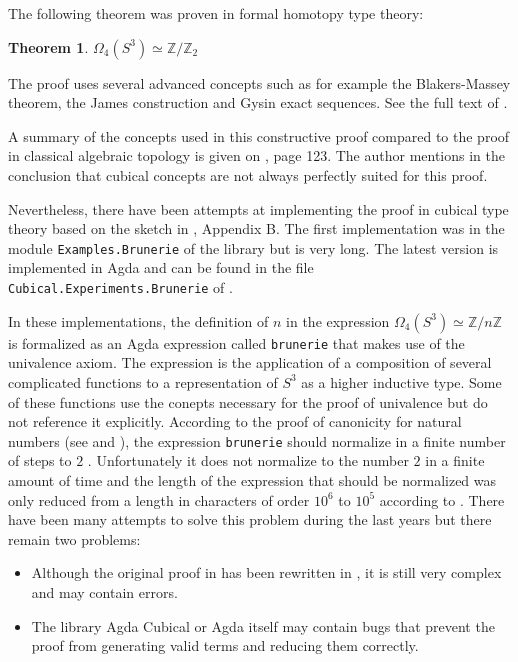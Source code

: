\documentclass[11pt,a4paper,twoside,xetex,draft]{book}
\newtheorem{theorem}{Theorem}[section]
\begin{document}
The following theorem was proven in formal homotopy type theory:

\begin{theorem}
$\Omega_4 ( S^3 ) \simeq \mathbb{Z} / \mathbb{Z}_2$
\end{theorem}

The proof uses several advanced concepts such as for example the Blakers-Massey theorem, the James construction and Gysin exact sequences. See the full text of \cite{Brunerie2016}.

A summary of the concepts used in this constructive proof compared to the proof in classical algebraic topology is given on \cite{Brunerie2016}, page 123. The author mentions in the conclusion that cubical concepts are not always perfectly suited for this proof. 

Nevertheless, there have been attempts at implementing the proof in cubical type theory based on the sketch in \cite{Brunerie2016}, Appendix B. The first implementation was in the module \texttt{Examples.Brunerie} of the library \cite{Moertberg2015} but is very long. The latest version is implemented in Agda and can be found in the file  \texttt{Cubical.Experiments.Brunerie} of \cite{Moertberg2018}. 

In these implementations, the definition of  $n$ in the expression $\Omega_4(S^3) \simeq \mathbb{Z}/n\mathbb{Z}$ is formalized as an Agda expression called \texttt{brunerie} that makes use of the univalence axiom. The expression is the application of a composition of several complicated functions to a representation of $S^3$ as a higher inductive type. Some of these functions use the conepts necessary for the proof of univalence but do not reference it explicitly. According to the proof of canonicity for natural numbers (see \cite{Huber2017} and \cite{Coquand2019}), the expression \texttt{brunerie} should normalize in a finite number of steps to $2$ . Unfortunately it does not normalize to the number $2$ in a finite amount of time and the length of the expression that should be normalized was  only reduced from a length in characters of order $10^6$ to $10^5$ according to \cite{Brunerie2018}. There have been many attempts to solve this problem during the last years but there remain two problems:
\begin{itemize}
\item Although the original proof in \cite{Moertberg2015} has been rewritten in \cite{Moertberg2018}, it is still very complex and may contain errors.
\item The library Agda Cubical or Agda itself may contain bugs that prevent the proof from generating valid terms and reducing them correctly.
\end{itemize}
\end{document}

